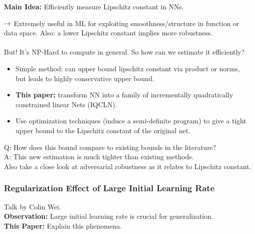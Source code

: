 {\bf Main Idea:} Efficiently measure Lipschitz constant in NNs. \\


$\rightarrow$ Extremely useful in ML for exploiting smoothness/structure in function or data space. Also: a lower Lipschitz constant implies more robustness. \\\\

But! It's NP-Hard to compute in general. So how can we estimate it efficiently?
\begin{itemize}
    \item Simple method: can upper bound lipschitz constant via product or norms, but leads to highly conservative upper bound.
    
    \item {\bf This paper;} transform NN into a family of incrementally quadratically constrained linear Nets (IQCLN).
    
    \item Use optimization techniques (induce a semi-definite program) to give a tight upper bound to the Lipschitz constant of the original net.
\end{itemize}

Q: How does this bound compare to existing bounds in the literature? \\

A: This new estimation is much tighter than existing methods. \\

Also take a close look at adversarial robustness as it relates to Lipschitz constant.

\spacerule
\subsubsection{Regularization Effect of Large Initial Learning Rate~\cite{li2019towards}}

Talk by Colin Wei. \\

{\bf Observation:} Large initial learning rate is crucial for generalization. \\

{\bf This Paper:} Explain this phenomena. \\

